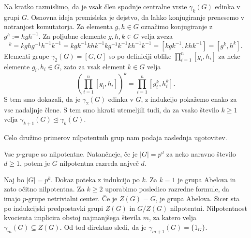 Na kratko razmislimo, da je vsak člen spodnje centralne vrste $\gamma_k(G)$ edinka v grupi $G$. 
Osnovna ideja premisleka je dejstvo, da lahko konjugiranje prenesemo v notranjost komutatorja. Za elementa $g, h \in G$ označimo konjugiranje z $g^h := hgh^{-1}$. Za poljubne elemente $g, h, k \in G$ velja zveza \begin{equation*}
    [g, h]^k = kghg^{-1}h^{-1}k^{-1} = kgk^{-1}khk^{-1}kg^{-1}k^{-1}kh^{-1}k^{-1} = [kgk^{-1}, khk^{-1}] = [g^k , h^k].
\end{equation*}
Elementi grupe $\gamma_2(G)  = [G , G]$ so po definiciji oblike $\prod_{i = 1}^n [g_i, h_i]$ za neke elemente $g_i, h_i \in G$, zato za vsak element $k \in G$ velja \begin{equation*}
    \left( \prod_{i = 1}^n [g_i, h_i]\right)^k = \prod_{i = 1}^n [g_i^k, h_i^k]. 
\end{equation*}
S tem smo dokazali, da je $\gamma_2(G)$ edinka v $G$, z indukcijo pokažemo enako za vse nadaljnje člene. S tem smo hkrati utemeljili tudi, da za vsako število $k \ge 1$ velja $\gamma_{k+1}(G) \trianglelefteq \gamma_k(G)$.

Celo družino primerov nilpotentnih grup nam podaja naslednja ugotovitev.
\begin{trditev}
\label{trd_p_grupe_so_nilpotentne}
    Vse $p$-grupe so nilpotentne. Natančneje, če je $\lvert G \rvert  = p^{d}$ za neko naravno število $d \ge 1$, potem je $G$ nilpotentna razreda največ $d$. 
\end{trditev}
\begin{dokaz}
    Naj bo $\lvert G \rvert = p^k$. Dokaz poteka z indukcijo po $k$. Za $k = 1$ je grupa Abelova in zato očitno nilpotentna. Za $k \ge 2$ uporabimo posledico razredne formule, da imajo $p$-grupe netrivialni center.
    Če je $Z(G) = G$, je grupa Abelova. Sicer sta po indukcijski predpostavki grupi $Z(G)$ in $G / Z(G)$ nilpotentni. Nilpotentnost kvocienta implicira obstoj najmanjšega števila $m$, za katero velja $\gamma_m(G) \subseteq Z(G)$.
    Od tod direktno sledi, da je $\gamma_{m + 1}(G) = \{ 1_G \}$.
\end{dokaz}

